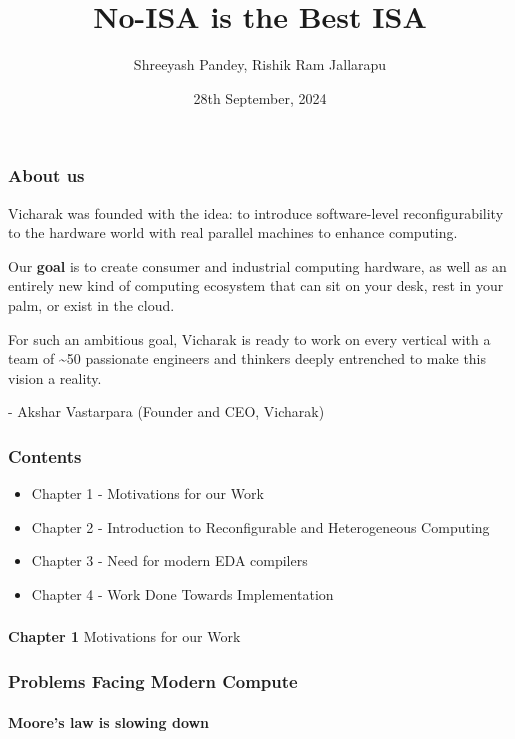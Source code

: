 \documentclass{beamer}
\title{No-ISA is the Best ISA}
\subtitle{}
\author{Shreeyash Pandey, Rishik Ram Jallarapu}
\institute{Vicharak, India @ vicharak.in}
\date{28th September, 2024}
\begin{document}
\begin{frame}
\titlepage
\end{frame}

{

\begin{frame}[fragile]
\frametitle{About us}

  Vicharak was founded with the idea: to introduce software-level
  reconfigurability to the hardware world with real parallel machines to enhance
  computing. 

  Our \textbf{goal} is to create consumer and industrial
  computing hardware, as well as an entirely new kind of computing ecosystem
  that can sit on your desk, rest in your palm, or exist in the cloud. 

  For such an ambitious goal, Vicharak is ready to work on every vertical with
  a team of \~{}50 passionate engineers and thinkers deeply entrenched to make this
  vision a reality.

  - Akshar Vastarpara (Founder and CEO, Vicharak)

\framesubtitle{}
\end{frame}

\begin{frame}[fragile]
\frametitle{Contents}

  \begin{itemize}
    \item Chapter 1 - Motivations for our Work
    \item Chapter 2 - Introduction to Reconfigurable and Heterogeneous Computing
    \item Chapter 3 - Need for modern EDA compilers
    \item Chapter 4 - Work Done Towards Implementation  
  \end{itemize}
\end{frame}

\begin{frame}[c,fragile]
  \frametitle{}
  \centering
  \textbf{Chapter 1}
  \centering
  Motivations for our Work
\end{frame}

\begin{frame}[fragile]
\frametitle{Problems Facing Modern Compute}
\framesubtitle{Moore's law is slowing down}


\end{frame}}
\end{document}
